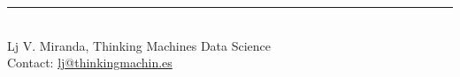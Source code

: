 \documentclass[10pt,landscape]{article}
\begin{document}
\begin{multicols}{3}
\nocite{*}


    
\vfill
\hrule
~\\
Lj V. Miranda, Thinking Machines Data Science\\
Contact: \href{mailto:lj@thinkingmachin.es}{lj@thinkingmachin.es}
\end{multicols}
\end{document}
